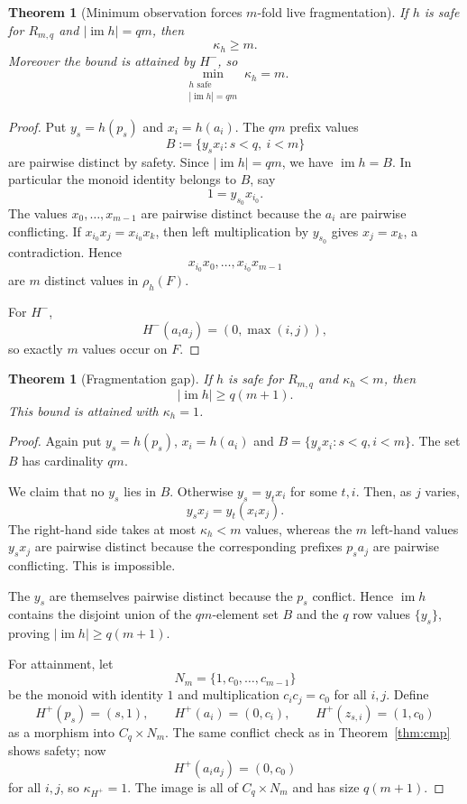 \documentclass[11pt]{article}
\newtheorem{theorem}[definition]{Theorem}
\newcommand{\im}{\operatorname{im}}
\begin{document}
\begin{theorem}[Minimum observation forces $m$-fold live fragmentation]
\label{thm:min-frag}
If $h$ is safe for $R_{m,q}$ and $|\im h|=qm$, then
\[
 \kappa_h\ge m.
\]
Moreover the bound is attained by $H^-$, so
\[
 \min_{\substack{h\text{ safe}\\|\im h|=qm}}\kappa_h=m.
\]
\end{theorem}

\begin{proof}
Put $y_s=h(p_s)$ and $x_i=h(a_i)$.  The $qm$ prefix values
\[
 B:=\{y_sx_i:s<q,\ i<m\}
\]
are pairwise distinct by safety.  Since $|\im h|=qm$, we have
$\im h=B$.  In particular the monoid identity belongs to $B$, say
\[
 1=y_{s_0}x_{i_0}.
\]
The values $x_0,\ldots,x_{m-1}$ are pairwise distinct because the $a_i$ are
pairwise conflicting.  If
$x_{i_0}x_j=x_{i_0}x_k$, then left multiplication by $y_{s_0}$ gives
$x_j=x_k$, a contradiction.  Hence
\[
 x_{i_0}x_0,\ldots,x_{i_0}x_{m-1}
\]
are $m$ distinct values in $\rho_h(F)$.

For $H^-$,
\[
 H^-(a_i a_j)=(0,\max(i,j)),
\]
so exactly $m$ values occur on $F$.
\end{proof}

\begin{theorem}[Fragmentation gap]
\label{thm:gap}
If $h$ is safe for $R_{m,q}$ and $\kappa_h<m$, then
\[
 |\im h|\ge q(m+1).
\]
This bound is attained with $\kappa_h=1$.
\end{theorem}

\begin{proof}
Again put $y_s=h(p_s)$, $x_i=h(a_i)$ and
$B=\{y_sx_i:s<q,i<m\}$.  The set $B$ has cardinality $qm$.

We claim that no $y_s$ lies in $B$.  Otherwise
$y_s=y_tx_i$ for some $t,i$.  Then, as $j$ varies,
\[
 y_sx_j=y_t(x_ix_j).
\]
The right-hand side takes at most $\kappa_h<m$ values, whereas the $m$
left-hand values $y_sx_j$ are pairwise distinct because the corresponding
prefixes $p_sa_j$ are pairwise conflicting.  This is impossible.

The $y_s$ are themselves pairwise distinct because the $p_s$ conflict.
Hence $\im h$ contains the disjoint union of the $qm$-element set $B$ and
the $q$ row values $\{y_s\}$, proving $|\im h|\ge q(m+1)$.

For attainment, let
\[
 N_m=\{1,c_0,\ldots,c_{m-1}\}
\]
be the monoid with identity $1$ and multiplication
$c_ic_j=c_0$ for all $i,j$.  Define
\[
 H^+(p_s)=(s,1),\qquad
 H^+(a_i)=(0,c_i),\qquad
 H^+(z_{s,i})=(1,c_0)
\]
as a morphism into $C_q\times N_m$.  The same conflict check as in
Theorem~\ref{thm:cmp} shows safety; now
\[
 H^+(a_i a_j)=(0,c_0)
\]
for all $i,j$, so $\kappa_{H^+}=1$.  The image is all of
$C_q\times N_m$ and has size $q(m+1)$.
\end{proof}
\end{document}
